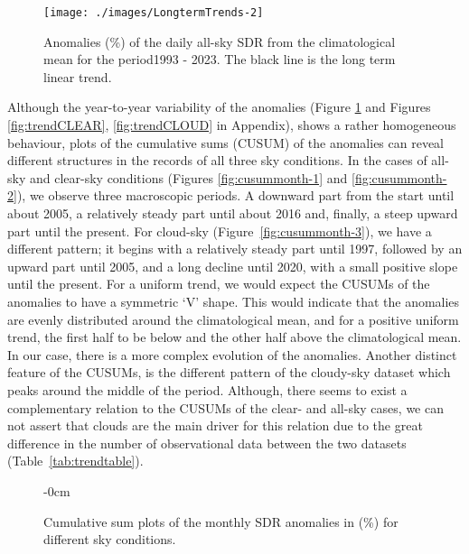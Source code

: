 \documentclass[applsci,article,submit,moreauthors,pdftex]{Definitions/mdpi}
\begin{document}
\begin{figure}[h!]

{\centering \texttt{[image: ./images/LongtermTrends-2]} 

}

\caption{Anomalies (\%) of the daily all-sky SDR from the climatological mean for the period1993 - 2023. The black line is the long term linear trend.}\label{fig:trendALL}
\end{figure}

Although the year-to-year variability of the anomalies (Figure
\ref{fig:trendALL} and Figures \ref{fig:trendCLEAR},
\ref{fig:trendCLOUD} in Appendix), shows a rather homogeneous behaviour,
plots of the cumulative sums (CUSUM) \citep{Regier2019} of the anomalies
can reveal different structures in the records of all three sky
conditions. In the cases of all-sky and clear-sky conditions (Figures
\ref{fig:cusummonth-1} and \ref{fig:cusummonth-2}), we observe three
macroscopic periods. A downward part from the start until about 2005, a
relatively steady part until about 2016 and, finally, a steep upward
part until the present. For cloud-sky (Figure~\ref{fig:cusummonth-3}),
we have a different pattern; it begins with a relatively steady part
until 1997, followed by an upward part until 2005, and a long decline
until 2020, with a small positive slope until the present. For a uniform
trend, we would expect the CUSUMs of the anomalies to have a symmetric
`V' shape. This would indicate that the anomalies are evenly distributed
around the climatological mean, and for a positive uniform trend, the
first half to be below and the other half above the climatological mean.
In our case, there is a more complex evolution of the anomalies. Another
distinct feature of the CUSUMs, is the different pattern of the
cloudy-sky dataset which peaks around the middle of the period.
Although, there seems to exist a complementary relation to the CUSUMs of
the clear- and all-sky cases, we can not assert that clouds are the main
driver for this relation due to the great difference in the number of
observational data between the two datasets
(Table~\ref{tab:trendtable}).

\begin{figure}[h!]
    \begin{adjustwidth}{-\extralength}{0cm}
        {\centering 
        \hfill
        \hfill
        \hfill
        }
\caption{Cumulative sum plots of the monthly SDR anomalies in (\%) for different sky conditions.}\label{fig:cusummonth}
\end{adjustwidth}
\end{figure}
\end{document}
